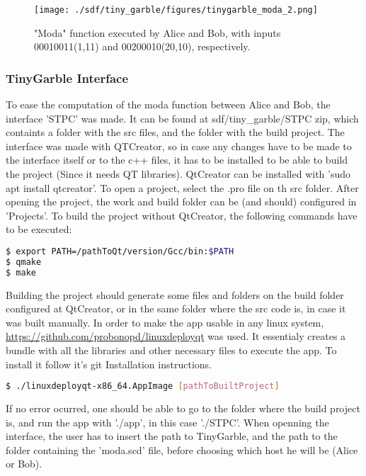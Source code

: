 \begin{refsection}
\begin{figure}[H]
	\centering
	\texttt{[image: ./sdf/tiny\_garble/figures/tinygarble\_moda\_2.png]}
    \caption{"Moda" function executed by Alice and Bob, with inputs 00010011(1,11) and 00200010(20,10), respectively.}\label{fig:tinygarble_moda_2}
\end{figure}

\newpage
\subsubsection{TinyGarble Interface}

To ease the computation of the moda function between Alice and Bob, the interface 'STPC' was made. It can be found at sdf/tiny\_garble/STPC zip, which containts a folder with the src files, and the folder with the build project. The interface was made with QTCreator, so in case any changes have to be made to the interface itself or to the c++ files, it has to be installed to be able to build the project (Since it needs QT libraries). QtCreator can be installed with 'sudo apt install qtcreator'. To open a project, select the .pro file on th src folder.
After opening the project, the work and build folder can be (and should) configured in 'Projects'.
To build the project without QtCreator, the following commands have to be executed:

\begin{lstlisting}[caption={Manually building QT application}, language=bash, captionpos=b]
$ export PATH=/pathToQt/version/Gcc/bin:$PATH
$ qmake
$ make
\end{lstlisting}

Building the project should generate some files and folders on the build folder configured at QtCreator, or in the same folder where the src code is, in case it was built manually. 
In order to make the app usable in any linux system, \url{https://github.com/probonopd/linuxdeployqt} was used. It essentialy creates a bundle with all the libraries and other necessary files to execute the app. To install it follow it's git Installation instructions. 

\begin{lstlisting}[caption={Deploying QT application}, language=bash, captionpos=b]
$ ./linuxdeployqt-x86_64.AppImage [pathToBuiltProject]
\end{lstlisting}

If no error ocurred, one should be able to go to the folder where the build project is, and run the app with './app', in this case './STPC'.
When openning the interface, the user has to insert the path to TinyGarble, and the path to the folder containing the 'moda.scd' file, before choosing which host he will be (Alice or Bob).


\end{refsection}

